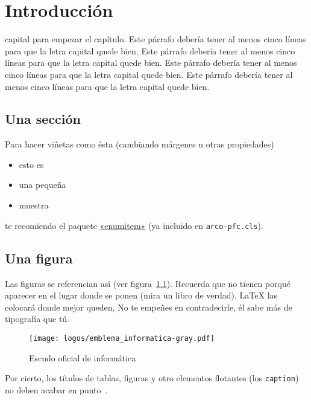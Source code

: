 
\chapter{Introducción}

 capital para empezar el capítulo. Este párrafo debería tener al menos cinco
líneas para que la letra capital quede bien. Este párrafo debería tener al menos cinco
líneas para que la letra capital quede bien. Este párrafo debería tener al menos cinco
líneas para que la letra capital quede bien. Este párrafo debería tener al menos cinco
líneas para que la letra capital quede bien.


\section{Una sección}

Para hacer viñetas como ésta (cambiando márgenes u otras propiedades)

\begin{itemize}[noitemsep, label=$\triangleright$]
\item esto es
\item una pequeña
\item muestra
\end{itemize}

te recomiendo el paquete
\href{http://mirror.ctan.org/macros/latex/contrib/enumitem/enumitem.pdf}{«enumitem»}
(ya incluido en \texttt{arco-pfc.cls}).


\section{Una figura}

Las figuras se referencian así (ver figura~\ref{fig:informatica}). Recuerda que
no tienen porqué aparecer en el lugar donde se ponen (mira un libro de
verdad). \LaTeX{} las colocará donde mejor queden, No te empeñes en
contradecirle, él sabe más de tipografía que tú.

\begin{figure}[!h]
\begin{center}
\texttt{[image: logos/emblema\_informatica-gray.pdf]}
\caption{Escudo oficial de informática}
\label{fig:informatica}
\end{center}
\end{figure}

Por cierto, los títulos de tablas, figuras y otro elementos flotantes (los
\texttt{caption}) no deben acabar en punto~\cite{Sousa08}.


